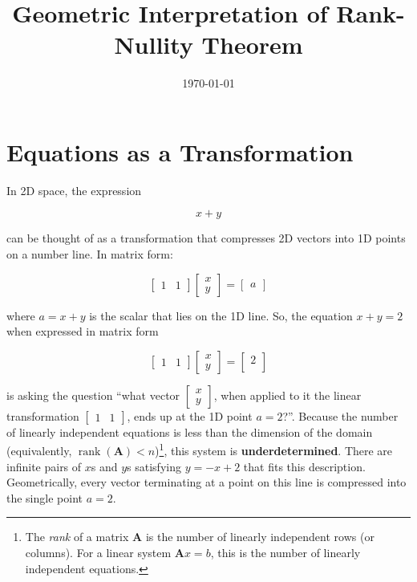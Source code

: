 \documentclass[11pt,a4paper]{article}
\title{Geometric Interpretation of Rank-Nullity Theorem}
\date{\today}
\begin{document}
\maketitle

\section{Equations as a Transformation}
In 2D space, the expression

\begin{equation}
    x + y
\end{equation}

can be thought of as a transformation that compresses 2D vectors into 1D points on a number line. In matrix form:

\begin{equation}
    \begin{bmatrix}
        1 & 1
    \end{bmatrix}
    \begin{bmatrix}
        x \\
        y
    \end{bmatrix}
    =
    \begin{bmatrix}
    a
    \end{bmatrix}
\end{equation}

where $a = x + y$ is the scalar that lies on the 1D line. So, the equation $x + y = 2$ when expressed in matrix form

\begin{equation}
    \begin{bmatrix}
        1 & 1
    \end{bmatrix}
    \begin{bmatrix}
        x \\
        y
    \end{bmatrix}
    =
    \begin{bmatrix}
        2 \\
    \end{bmatrix}
\end{equation}

is asking the question ``what vector $\begin{bmatrix} x \\ y \end{bmatrix}$, when applied to it the linear transformation $\begin{bmatrix} 1 & 1 \end{bmatrix}$, ends up at the 1D point $a=2$?''. Because the number of linearly independent equations is less than the dimension of the domain (equivalently,
    \(\operatorname{rank}(\mathbf{A})<n\))\footnote{The \emph{rank} of a matrix \(\mathbf{A}\) is the number of linearly independent rows (or columns). For a linear system \(\mathbf{A}x=b\), this is the number of linearly independent equations.}, this system is \textbf{underdetermined}. There are infinite pairs of \(x\)s and \(y\)s satisfying \(y = - x + 2\) that fits this description. Geometrically, every vector terminating at a point on this line is compressed into the single point \(a=2\).
\end{document}
